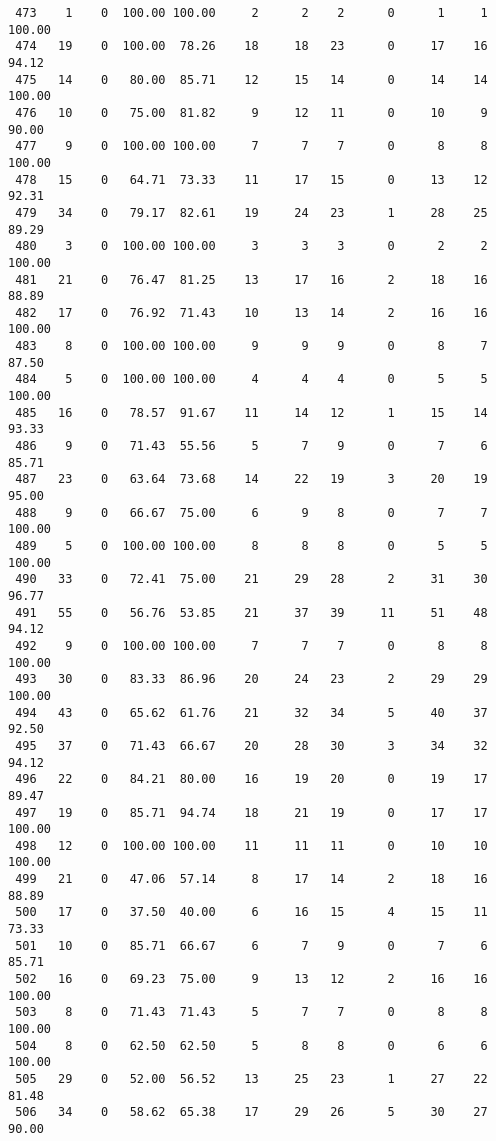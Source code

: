 \begin{verbatim}
 473    1    0  100.00 100.00     2      2    2      0      1     1   100.00
 474   19    0  100.00  78.26    18     18   23      0     17    16    94.12
 475   14    0   80.00  85.71    12     15   14      0     14    14   100.00
 476   10    0   75.00  81.82     9     12   11      0     10     9    90.00
 477    9    0  100.00 100.00     7      7    7      0      8     8   100.00
 478   15    0   64.71  73.33    11     17   15      0     13    12    92.31
 479   34    0   79.17  82.61    19     24   23      1     28    25    89.29
 480    3    0  100.00 100.00     3      3    3      0      2     2   100.00
 481   21    0   76.47  81.25    13     17   16      2     18    16    88.89
 482   17    0   76.92  71.43    10     13   14      2     16    16   100.00
 483    8    0  100.00 100.00     9      9    9      0      8     7    87.50
 484    5    0  100.00 100.00     4      4    4      0      5     5   100.00
 485   16    0   78.57  91.67    11     14   12      1     15    14    93.33
 486    9    0   71.43  55.56     5      7    9      0      7     6    85.71
 487   23    0   63.64  73.68    14     22   19      3     20    19    95.00
 488    9    0   66.67  75.00     6      9    8      0      7     7   100.00
 489    5    0  100.00 100.00     8      8    8      0      5     5   100.00
 490   33    0   72.41  75.00    21     29   28      2     31    30    96.77
 491   55    0   56.76  53.85    21     37   39     11     51    48    94.12
 492    9    0  100.00 100.00     7      7    7      0      8     8   100.00
 493   30    0   83.33  86.96    20     24   23      2     29    29   100.00
 494   43    0   65.62  61.76    21     32   34      5     40    37    92.50
 495   37    0   71.43  66.67    20     28   30      3     34    32    94.12
 496   22    0   84.21  80.00    16     19   20      0     19    17    89.47
 497   19    0   85.71  94.74    18     21   19      0     17    17   100.00
 498   12    0  100.00 100.00    11     11   11      0     10    10   100.00
 499   21    0   47.06  57.14     8     17   14      2     18    16    88.89
 500   17    0   37.50  40.00     6     16   15      4     15    11    73.33
 501   10    0   85.71  66.67     6      7    9      0      7     6    85.71
 502   16    0   69.23  75.00     9     13   12      2     16    16   100.00
 503    8    0   71.43  71.43     5      7    7      0      8     8   100.00
 504    8    0   62.50  62.50     5      8    8      0      6     6   100.00
 505   29    0   52.00  56.52    13     25   23      1     27    22    81.48
 506   34    0   58.62  65.38    17     29   26      5     30    27    90.00

\end{verbatim}
